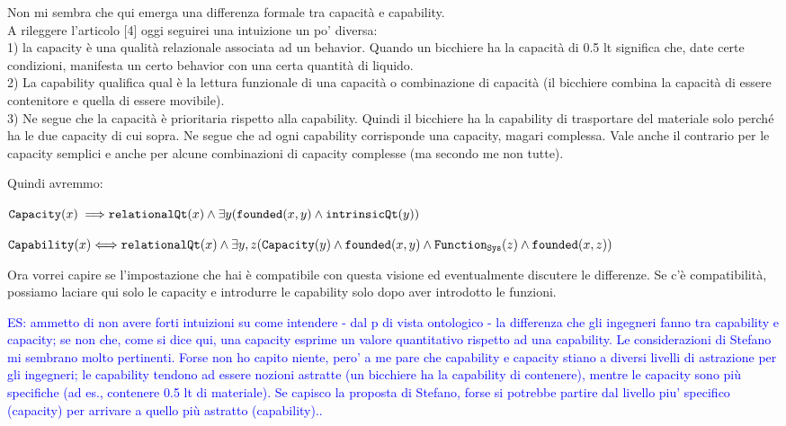 \documentclass[sw]{iosart2x}
\newcommand{\bflist}{\begin{list}{}{\setlength{\topsep}{2mm}\setlength{\partopsep}{0mm}\setlength{\parsep}{0mm}\setlength{\leftmargin}{9mm}\setlength{\labelwidth}{8mm}}}
\newcommand{\eflist}{\end{list}}
\newcommand{\AxLabel}{\textrm{a}}
\newcounter{cntax}
\newcommand{\myax}[1]{\refstepcounter{cntax}\begin{small}{\bf \AxLabel\thecntax\label{ax:#1}}\end{small}}
\newcommand{\generalStyle}[1]{\texttt{#1}}
\newcommand{\biRel}[3]{\generalStyle{#1}(#2,#3)}
\newcommand{\uniRel}[2]{\generalStyle{#1}(#2)}
\newcommand{\uniRelPar}[3]{\generalStyle{#1}_{\generalStyle{#3}}(#2)}
\newcommand{\myiff}{\Longleftrightarrow}
\newcommand{\myfi}{\hspace{0.9mm} \Longrightarrow}
\newcommand{\Capability}[1]{\uniRel{Capability}{#1}}
\newcommand{\Capacity}[1]{\uniRel{Capacity}{#1}}
\newcommand{\RelationalQuality}[1]{\uniRel{relationalQt}{#1}}
\newcommand{\IntrinsicQuality}[1]{\uniRel{intrinsicQt}{#1}}
\newcommand{\FunctionSys}[1]{\uniRelPar{Function}{#1}{Sys}}
\newcommand{\founded}[2]{\biRel{\foundedTerm{passive}}{#1}{#2}}
\newcommand{\foundedTerm}[1]{%
  \ifthenelse{\equal{#1}{passive}}{founded}{%
    \ifthenelse{\equal{#1}{verb}}{found}{%
      \ifthenelse{\equal{#1}{gerund}}{founding}{%
        ERROR!%
      }%
    }%
  }%
}
\newcommand{\TODO}[1]{{\color{red} #1}}
\begin{document}
\TODO{Non mi sembra che qui emerga una differenza formale tra capacità e capability.\\ 
A rileggere l'articolo [4] oggi seguirei una intuizione un po' diversa:\\ 
1) la capacity è una qualità relazionale associata ad un behavior. Quando un bicchiere ha la capacità di 0.5 lt significa che, date certe condizioni, manifesta un certo behavior con una certa quantità di liquido.\\
2) La capability qualifica qual è la lettura funzionale di una capacità o combinazione di capacità (il bicchiere combina la capacità di essere contenitore e quella di essere movibile). \\
3) Ne segue che la capacità è prioritaria rispetto alla capability. Quindi il bicchiere ha la capability di trasportare del materiale solo perché ha le due capacity di cui sopra.
Ne segue che ad ogni capability corrisponde una capacity, magari complessa. Vale anche il contrario per le capacity semplici e anche per alcune combinazioni di capacity complesse (ma secondo me non tutte).

Quindi avremmo:
\bflist
\item[\myax{xx}]  $\Capacity{x} \myfi \RelationalQuality{x} \land  \exists y (\founded{x}{y} \land \IntrinsicQuality{y}) $
\item[\myax{subsumptionCapacSB}] $ \Capability{x} \myiff  \RelationalQuality{x} \land \exists y,z(\Capacity{y} \land \founded{x}{y} \land \FunctionSys{z} \land \founded{x}{z}) $  
\eflist
Ora vorrei capire se l'impostazione che hai è compatibile con questa visione ed eventualmente discutere le differenze. Se c'è compatibilità, possiamo laciare qui solo le capacity e introdurre le capability solo dopo aver introdotto le funzioni.
} 
\textcolor{blue}{ES: ammetto di non avere forti intuizioni su come intendere - dal p di vista ontologico - la differenza che gli ingegneri fanno tra capability e capacity; se non che, come si dice qui, una capacity esprime un valore quantitativo rispetto ad una capability. Le considerazioni di Stefano mi sembrano molto pertinenti. Forse non ho capito niente, pero' a me pare che capability e capacity stiano a diversi livelli di astrazione per gli ingegneri; le capability tendono ad essere nozioni astratte (un bicchiere ha la capability di contenere), mentre le capacity sono più specifiche (ad es., contenere 0.5 lt di materiale). Se capisco la proposta di Stefano, forse si potrebbe partire dal livello piu' specifico (capacity) per arrivare a quello più astratto (capability)..}
\end{document}
